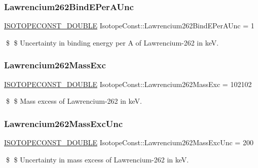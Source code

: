 \subsubsection{\texorpdfstring{Lawrencium262\+Bind\+E\+Per\+A\+Unc}{Lawrencium262BindEPerAUnc}}
{\footnotesize\ttfamily \mbox{\hyperlink{group___isotope_const-_macros_ga8f45a7272ce02c0b4c65c44636ed719a}{I\+S\+O\+T\+O\+P\+E\+C\+O\+N\+S\+T\+\_\+\+D\+O\+U\+B\+LE}} Isotope\+Const\+::\+Lawrencium262\+Bind\+E\+Per\+A\+Unc = 1}

\$ \$ Uncertainty in binding energy per A of Lawrencium-\/262 in keV. \mbox{\label{group___isotope_const-_lawrencium-_lr262_gaa312f75b707553648c7e2498d5f17a1f}} 
\subsubsection{\texorpdfstring{Lawrencium262\+Mass\+Exc}{Lawrencium262MassExc}}
{\footnotesize\ttfamily \mbox{\hyperlink{group___isotope_const-_macros_ga8f45a7272ce02c0b4c65c44636ed719a}{I\+S\+O\+T\+O\+P\+E\+C\+O\+N\+S\+T\+\_\+\+D\+O\+U\+B\+LE}} Isotope\+Const\+::\+Lawrencium262\+Mass\+Exc = 102102}

\$ \$ Mass excess of Lawrencium-\/262 in keV. \mbox{\label{group___isotope_const-_lawrencium-_lr262_ga84898ad956d79c747cc109964a00564a}} 
\subsubsection{\texorpdfstring{Lawrencium262\+Mass\+Exc\+Unc}{Lawrencium262MassExcUnc}}
{\footnotesize\ttfamily \mbox{\hyperlink{group___isotope_const-_macros_ga8f45a7272ce02c0b4c65c44636ed719a}{I\+S\+O\+T\+O\+P\+E\+C\+O\+N\+S\+T\+\_\+\+D\+O\+U\+B\+LE}} Isotope\+Const\+::\+Lawrencium262\+Mass\+Exc\+Unc = 200}

\$ \$ Uncertainty in mass excess of Lawrencium-\/262 in keV. \mbox{\label{group___isotope_const-_lawrencium-_lr262_gac1ff17660d04832b3bd7d12295190dbb}} 
